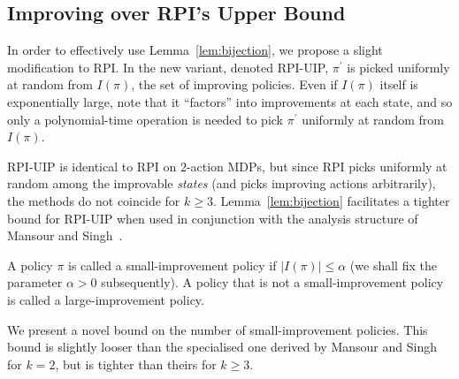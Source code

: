 \subsection{Improving over RPI's Upper Bound}



In order to effectively use Lemma~\ref{lem:bijection}, we propose a slight modification to RPI. In the new variant, denoted RPI-UIP, $\pi^{\prime}$ is picked uniformly at random from $I(\pi)$, the set of improving policies. Even if $I(\pi)$ itself is exponentially large, note that it ``factors'' into improvements at each state, and so 
only a polynomial-time operation is needed to pick $\pi^{\prime}$ uniformly at random from $I(\pi)$.


RPI-UIP is identical to RPI on $2$-action MDPs, but since RPI picks uniformly at random among the improvable \textit{states} (and picks improving actions arbitrarily), the methods do not coincide for $k \geq 3$. 
Lemma~\ref{lem:bijection} facilitates a tighter bound for RPI-UIP when used in conjunction with the analysis structure of Mansour and Singh~.

\begin{definition}
A policy $\pi$ is called a small-improvement policy if $|I(\pi)| \leq \alpha$ (we shall fix the parameter $\alpha > 0$ subsequently). A policy that is not a small-improvement policy is called a large-improvement policy.
\end{definition}


We present a novel bound on the number of small-improvement policies. This bound is slightly looser than the specialised one derived by Mansour and Singh~ for $k = 2$, but is tighter than theirs for $k \geq 3$.

